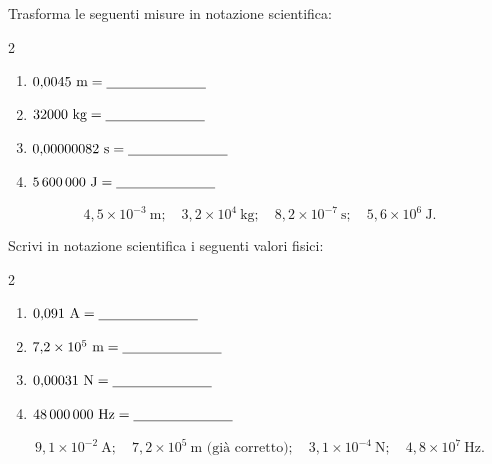 \begin{question}[ID=1.1, subtitle={Conversione in notazione scientifica — base}, tags={notazione scientifica}, difficulty=facile]
Trasforma le seguenti misure in notazione scientifica:
\begin{center}\begin{minipage}{0.92\linewidth}
\begin{multicols}{2}
\begin{enumerate}
\item $0{,}0045\ \text{m} = \underline{\hspace{2.5cm}}$
\item $32000\ \text{kg} = \underline{\hspace{2.5cm}}$
\item $0{,}00000082\ \text{s} = \underline{\hspace{2.5cm}}$
\item $5\,600\,000\ \text{J} = \underline{\hspace{2.5cm}}$
\end{enumerate}
\end{multicols}
\end{minipage}\end{center}
\begin{solution}
\[
4{,}5\times10^{-3}\ \text{m};\quad 3{,}2\times10^{4}\ \text{kg};\quad 8{,}2\times10^{-7}\ \text{s};\quad 5{,}6\times10^{6}\ \text{J}.
\]
\end{solution}
\end{question}

\begin{question}[ID=1.2, subtitle={Notazione scientifica di grandezze fisiche}, tags={notazione scientifica}, difficulty=facile]
Scrivi in notazione scientifica i seguenti valori fisici:
\begin{center}\begin{minipage}{0.92\linewidth}
\begin{multicols}{2}
\begin{enumerate}
\item $0{,}091\ \text{A} = \underline{\hspace{2.5cm}}$
\item $7{,}2\times 10^{5}\ \text{m} = \underline{\hspace{2.5cm}}$
\item $0{,}00031\ \text{N} = \underline{\hspace{2.5cm}}$
\item $48\,000\,000\ \text{Hz} = \underline{\hspace{2.5cm}}$
\end{enumerate}
\end{multicols}
\end{minipage}\end{center}
\begin{solution}
\[
9{,}1\times10^{-2}\ \text{A};\quad 7{,}2\times10^{5}\ \text{m} \text{ (già corretto)};\quad 3{,}1\times10^{-4}\ \text{N};\quad 4{,}8\times10^{7}\ \text{Hz}.
\]
\end{solution}
\end{question}


